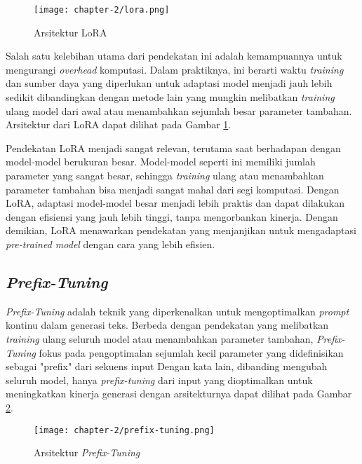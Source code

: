 \begin{figure}[h]
    \vspace{0.25cm}
    \centering
    \texttt{[image: chapter-2/lora.png]}
    \caption{Arsitektur LoRA \parencite{lora}}
    \label{fig:lora}
\end{figure}

Salah satu kelebihan utama dari pendekatan ini adalah kemampuannya untuk mengurangi \textit{overhead} komputasi. Dalam praktiknya, ini berarti waktu \textit{training} dan sumber daya yang diperlukan untuk adaptasi model menjadi jauh lebih sedikit dibandingkan dengan metode lain yang mungkin melibatkan \textit{training} ulang model dari awal atau menambahkan sejumlah besar parameter tambahan. Arsitektur dari LoRA dapat dilihat pada Gambar \ref{fig:lora}.

Pendekatan LoRA menjadi sangat relevan, terutama saat berhadapan dengan model-model berukuran besar. Model-model seperti ini memiliki jumlah parameter yang sangat besar, sehingga \textit{training} ulang atau menambahkan parameter tambahan bisa menjadi sangat mahal dari segi komputasi. Dengan LoRA, adaptasi model-model besar menjadi lebih praktis dan dapat dilakukan dengan efisiensi yang jauh lebih tinggi, tanpa mengorbankan kinerja. Dengan demikian, LoRA menawarkan pendekatan yang menjanjikan untuk mengadaptasi \textit{pre-trained model} dengan cara yang lebih efisien.

\subsection{\textit{Prefix-Tuning}}

\textit{Prefix-Tuning} adalah teknik yang diperkenalkan untuk mengoptimalkan \textit{prompt} kontinu dalam generasi teks. Berbeda dengan pendekatan  yang melibatkan \textit{training} ulang seluruh model atau menambahkan parameter tambahan, \textit{Prefix-Tuning} fokus pada pengoptimalan sejumlah kecil parameter yang didefinisikan sebagai "prefix" dari sekuens input \parencite{prefix_tuning} Dengan kata lain, dibanding mengubah seluruh model, hanya \textit{prefix-tuning} dari input yang dioptimalkan untuk meningkatkan kinerja generasi dengan arsitekturnya dapat dilihat pada Gambar \ref{fig:prefix-tuning}.

\begin{figure}[h]
    \vspace{0.25cm}
    \centering
    \texttt{[image: chapter-2/prefix-tuning.png]}
    \caption{Arsitektur \textit{Prefix-Tuning} \parencite{prefix_tuning}}
    \label{fig:prefix-tuning}
\end{figure}

